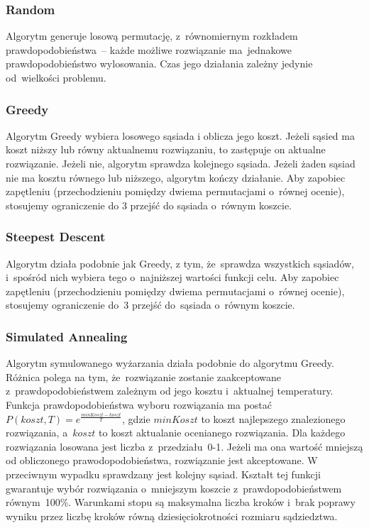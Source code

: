 \documentclass[a4paper,10pt]{article}
\begin{document}
\subsubsection{Random}
Algorytm generuje losową permutację, z~równomiernym rozkładem prawdopodobieństwa~-- każde możliwe rozwiązanie
ma~jednakowe prawdopodobieństwo wylosowania. 
Czas jego działania zależny jedynie od~wielkości problemu.


\subsubsection{Greedy}
Algorytm Greedy wybiera losowego sąsiada i oblicza jego koszt.
Jeżeli sąsied ma koszt niższy lub równy aktualnemu rozwiązaniu, to zastępuje on aktualne rozwiązanie.
Jeżeli nie, algorytm sprawdza kolejnego sąsiada.
Jeżeli żaden sąsiad nie ma kosztu równego lub niższego, algorytm kończy działanie.
Aby zapobiec zapętleniu (przechodzieniu pomiędzy dwiema permutacjami o~równej ocenie), stosujemy ograniczenie do 3 przejść do sąsiada o~równym koszcie.

\subsubsection{Steepest Descent}
Algorytm działa podobnie jak Greedy, z tym, że~sprawdza wszystkich sąsiadów, i~spośród nich wybiera tego
o~najniższej wartości funkcji celu.
Aby zapobiec zapętleniu (przechodzieniu pomiędzy dwiema permutacjami o~równej ocenie),
stosujemy ograniczenie do~3 przejść do~sąsiada o~równym koszcie.

\subsubsection{Simulated Annealing}
Algorytm symulowanego wyżarzania działa podobnie do algorytmu Greedy.
Różnica polega na tym, że~rozwiązanie zostanie zaakceptowane z~prawdopodobieństwem zależnym od jego kosztu i~aktualnej temperatury.
Funkcja prawdopodobieństwa wyboru rozwiązania ma postać $P(koszt, T) = e^{\frac{minKoszt-koszt}{T}}$, gdzie $minKoszt$ to koszt najlepszego znalezionego rozwiązania, a~$koszt$ to koszt aktualanie ocenianego rozwiązania.
Dla każdego rozwiązania losowana jest liczba z~przedziału~0-1.
Jeżeli ma ona wartość mniejszą od obliczonego prawodopodobieństwa, rozwiązanie jest akceptowane.
W przeciwnym wypadku sprawdzany jest kolejny sąsiad.
Kształt tej funkcji gwarantuje wybór rozwiązania o~mniejszym koszcie z~prawdopodobieństwem równym~100\%.
Warunkami stopu są maksymalna liczba kroków i~brak poprawy wyniku przez liczbę kroków równą dziesięciokrotności rozmiaru sądziedztwa.
\end{document}
